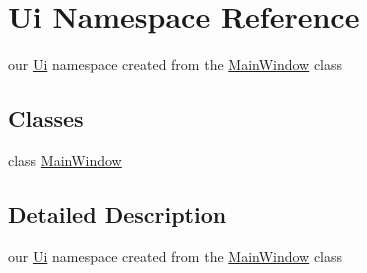 \hypertarget{namespaceUi}{}\section{Ui Namespace Reference}
\label{namespaceUi}


our \hyperlink{namespaceUi}{Ui} namespace created from the \hyperlink{classUi_1_1MainWindow}{Main\+Window} class  


\subsection*{Classes}
\begin{DoxyCompactItemize}
\item 
class \hyperlink{classUi_1_1MainWindow}{Main\+Window}
\end{DoxyCompactItemize}


\subsection{Detailed Description}
our \hyperlink{namespaceUi}{Ui} namespace created from the \hyperlink{classUi_1_1MainWindow}{Main\+Window} class 